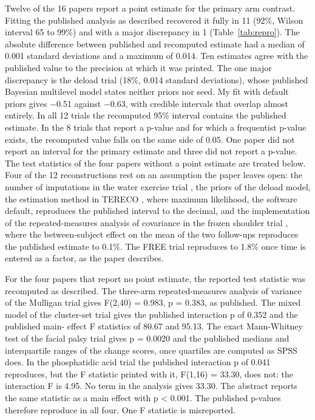 Twelve of the 16 papers report a point estimate for the primary arm contrast. Fitting the published analysis as described recovered it fully in 11 (92\%, Wilson interval 65 to 99\%) and with a major discrepancy in 1 (Table~\ref{tab:repro}). The absolute difference between published and recomputed estimate had a median of 0.001 standard deviations and a maximum of 0.014. Ten estimates agree with the published value to the precision at which it was printed. The one major discrepancy is the deload trial \cite{Coleman_2024} (18\%, 0.014 standard deviations), whose published Bayesian multilevel model states neither priors nor seed. My fit with default priors gives $-$0.51 against $-$0.63, with credible intervals that overlap almost entirely. In all 12 trials the recomputed 95\% interval contains the published estimate. In the 8 trials that report a p-value and for which a frequentist p-value exists, the recomputed value falls on the same side of 0.05. One paper did not report an interval for the primary estimate and three did not report a p-value. The test statistics of the four papers without a point estimate are treated below. Four of the 12 reconstructions rest on an assumption the paper leaves open: the number of imputations in the water exercise trial \cite{Navas_2021}, the priors of the deload model, the estimation method in TERECO \cite{Li_2022}, where maximum likelihood, the software default, reproduces the published interval to the decimal, and the implementation of the repeated-measures analysis of covariance in the frozen shoulder trial \cite{Sharma_2016}, where the between-subject effect on the mean of the two follow-ups reproduces the published estimate to 0.1\%. The FREE trial \cite{Darlow_2019} reproduces to 1.8\% once time is entered as a factor, as the paper describes.

For the four papers that report no point estimate, the reported test statistic was recomputed as described. The three-arm repeated-measures analysis of variance of the Mulligan trial \cite{Kiouloukiotis_2026} gives F(2,40) = 0.983, p = 0.383, as published. The mixed model of the cluster-set trial \cite{Hobein_2026} gives the published interaction p of 0.352 and the published main- effect F statistics of 80.67 and 95.13. The exact Mann-Whitney test of the facial palsy trial \cite{Santiago_2024} gives p = 0.0020 and the published medians and interquartile ranges of the change scores, once quartiles are computed as SPSS does. In the phosphatidic acid trial \cite{Escalante_2016} the published interaction p of 0.041 reproduces, but the F statistic printed with it, F(1,16) = 33.30, does not: the interaction F is 4.95. No term in the analysis gives 33.30. The abstract reports the same statistic as a main effect with p \textless{} 0.001. The published p-values therefore reproduce in all four. One F statistic is misreported.

